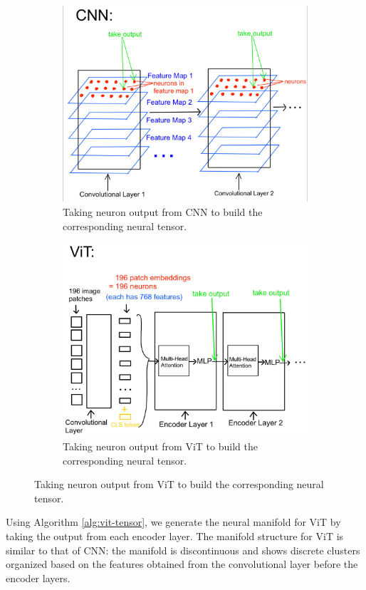 \begin{figure}[H]
\centering
\begin{subfigure}[b]{0.45\textwidth}
    \includegraphics[width=\textwidth]{figures/artificial/cnn-tensor.jpg}
    \caption{Taking neuron output from CNN to build the corresponding neural tensor.}
\end{subfigure}
\hfill
\begin{subfigure}[b]{0.5\textwidth}
    \includegraphics[width=\textwidth]{figures/artificial/vit-tensor.jpg}
    \caption{Taking neuron output from ViT to build the corresponding neural tensor.}
\end{subfigure}
\end{figure} 
Using Algorithm \ref{alg:vit-tensor}, we generate the neural manifold for ViT by taking the output from each encoder layer. The manifold structure for ViT is similar to that of CNN: the manifold is discontinuous and shows discrete clusters organized based on the features obtained from the convolutional layer before the encoder layers. 

